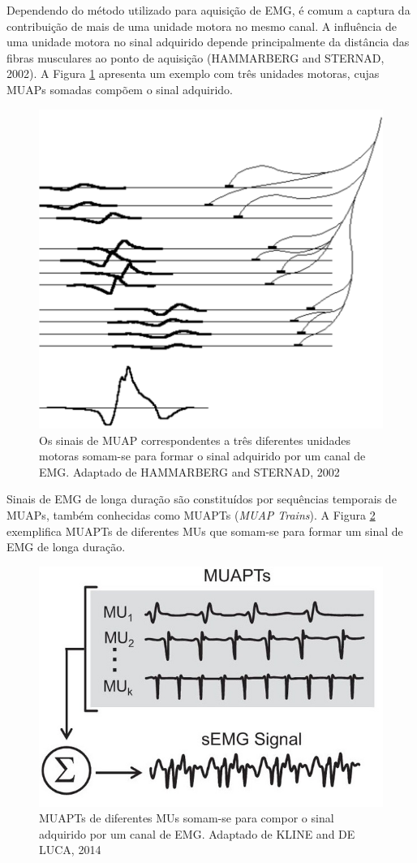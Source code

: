 \documentclass[
	12pt,				%
	openright,			%
	oneside,
	a4paper,			%
	english,			%
	francais,			%
	spanish,			%
	brazil				%
	]{abntex2}
\begin{document}
	Dependendo do método utilizado para aquisição de EMG, é comum a captura da contribuição de mais de uma unidade motora no mesmo canal. A influência de uma unidade motora no sinal adquirido depende principalmente da distância das fibras musculares ao ponto de aquisição (HAMMARBERG and STERNAD, 2002). A Figura \ref{fig:MUAP_soma} apresenta um exemplo com três unidades motoras, cujas MUAPs somadas compõem o sinal adquirido.
	
\begin{figure}
\centering
\includegraphics[width=0.6\linewidth]{./img/MUAP_soma.PNG}
\caption{Os sinais de MUAP correspondentes a três diferentes unidades motoras somam-se para formar o sinal adquirido por um canal de EMG. Adaptado de HAMMARBERG and STERNAD, 2002}
\label{fig:MUAP_soma}
\end{figure}
	
	Sinais de EMG de longa duração são constituídos por sequências temporais de MUAPs, também conhecidas como MUAPTs (\emph{MUAP Trains}). A Figura \ref{fig:MUAP_trains} exemplifica MUAPTs de diferentes MUs que somam-se para formar um sinal de EMG de longa duração.
	
\begin{figure}
\centering
\includegraphics[width=0.6\linewidth]{./img/MUAP_trains.jpg}
\caption{MUAPTs de diferentes MUs somam-se para compor o sinal adquirido por um canal de EMG. Adaptado de KLINE and DE LUCA, 2014}
\label{fig:MUAP_trains}
\end{figure}
\end{document}
